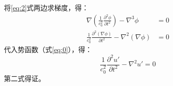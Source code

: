 \noindent 将\eqref{eq:2}式两边求梯度，得：
\begin{equation}
    \begin{aligned}
        \nabla \left(\frac{1}{c_{0}^{2}} \frac{\partial^{2} \phi}{\partial t^{2}}\right)-\nabla^{3} \phi &= 0 \\
        \frac{1}{c_{0}^{2}} \frac{\partial^{2} \left(\nabla \phi\right)}{\partial t^{2}}-\nabla^{2} \left(\nabla \phi\right) &= 0
    \end{aligned}
\end{equation}
代入势函数（式\eqref{eq:0}），得：
\begin{equation}
    \frac{1}{c_{0}^{2}} \frac{\partial^{2} u'}{\partial t^{2}}-\nabla^{2} u'=0
\end{equation}
第二式得证。

